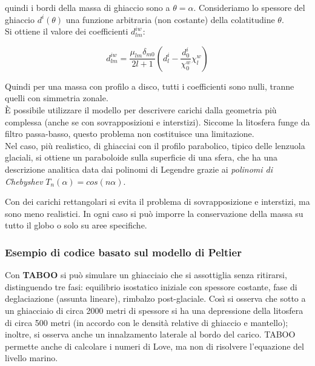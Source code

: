 \documentclass[a4paper,12pt]{book}
\begin{document}
\noindent
quindi i bordi della massa di ghiaccio sono a $\theta = \alpha$.
Consideriamo lo spessore del ghiaccio $d^i(\theta)$ una funzione arbitraria (non costante) della colatitudine $\theta$.\\

\noindent
Si ottiene il valore dei coefficienti $d^{iw}_{lm}$:

\begin{equation}
    d^{iw}_{lm} = \frac{\mu_{lm} \delta_{m0}}{2l+1} \left (d_l^i - \frac{d_0^i}{\chi_0^w}\chi_l^w \right)
\end{equation}

\noindent
Quindi per una massa con profilo a disco, tutti i coefficienti sono nulli, tranne quelli con simmetria zonale.\\

\noindent
È possibile utilizzare il modello per descrivere carichi dalla geometria più complessa (anche se con sovrapposizioni e interstizi).
Siccome la litosfera funge da filtro passa-basso, questo problema non costituisce una limitazione.\\

\noindent
Nel caso, più realistico, di ghiacciai con il profilo parabolico, tipico delle lenzuola glaciali, si ottiene un paraboloide sulla superficie di una sfera, che ha una descrizione analitica data dai polinomi di Legendre grazie ai \textit{polinomi di Chebyshev} $T_n(\alpha) = cos (n \alpha)$.

Con dei carichi rettangolari si evita il problema di sovrapposizione e interstizi, ma sono meno realistici.
In ogni caso si può imporre la conservazione della massa su tutto il globo o solo su aree specifiche.

\subsubsection{\textcolor{colore7}{Esempio di codice basato sul modello di Peltier}}

Con \textbf{TABOO} si può simulare un ghiacciaio che si assottiglia senza ritirarsi, distinguendo tre fasi: equilibrio isostatico iniziale con spessore costante, fase di deglaciazione (assunta lineare), rimbalzo post-glaciale.
Così si osserva che sotto a un ghiacciaio di circa 2000 metri di spessore si ha una depressione della litosfera di circa 500 metri (in accordo con le densità relative di ghiaccio e mantello); inoltre, si osserva anche un innalzamento laterale al bordo del carico.
TABOO permette anche di calcolare i numeri di Love, ma non di risolvere l'equazione del livello marino.
\end{document}
